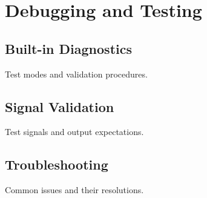 \section{Debugging and Testing}
\subsection{Built-in Diagnostics}
Test modes and validation procedures.
\subsection{Signal Validation}
Test signals and output expectations.
\subsection{Troubleshooting}
Common issues and their resolutions.